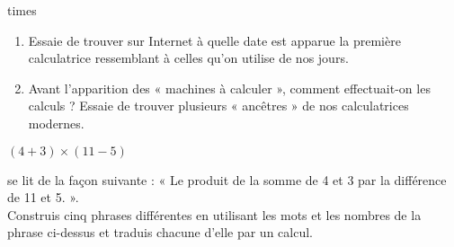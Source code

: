 times\begin{exercice}
 \begin{enumerate}
  \item Essaie de trouver sur Internet à quelle date est apparue la première calculatrice ressemblant à celles qu'on utilise de nos jours.
  \item Avant l'apparition des « machines à calculer », comment effectuait-on les calculs ? Essaie de trouver plusieurs « ancêtres » de nos calculatrices modernes.
  \end{enumerate}
\end{exercice}


\begin{exercice}
\begin{center} $(4 + 3) \times (11 - 5)$ \end{center}
se lit de la façon suivante : « Le produit de la somme de 4 et 3 par la différence de 11 et 5. ». \\[0.75em]
Construis cinq phrases différentes en utilisant les mots et les nombres de la phrase ci-dessus et traduis chacune d’elle par un calcul.
\end{exercice}


